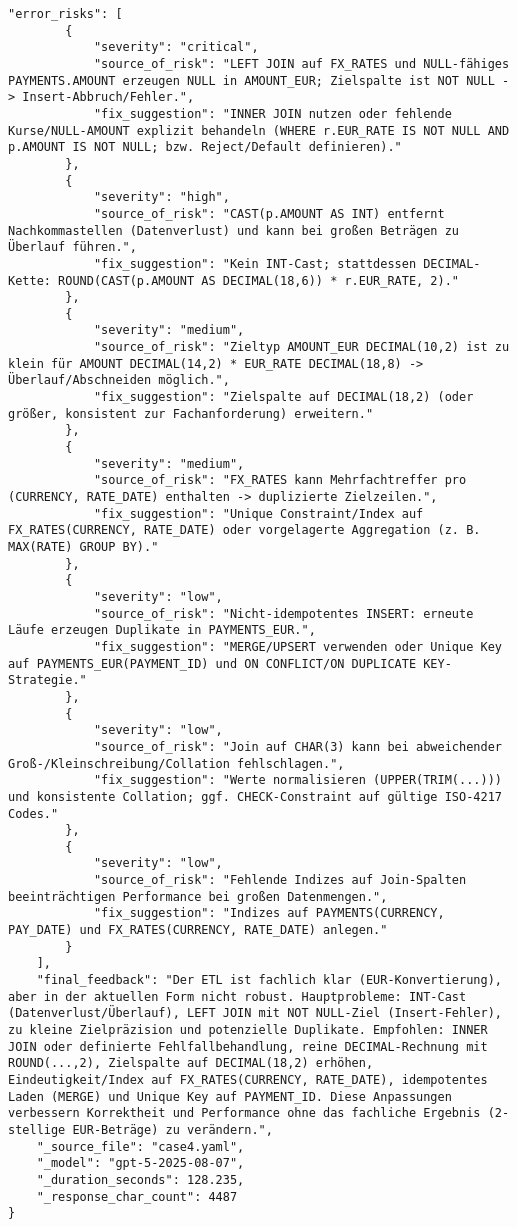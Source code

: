 \begin{lstlisting}[caption={Ausgabe: GPT-5 Anwendungsfall 4 Hauptdurchlauf},label={gpt_case4_prompt1}]
    "error_risks": [
        {
            "severity": "critical",
            "source_of_risk": "LEFT JOIN auf FX_RATES und NULL-fähiges PAYMENTS.AMOUNT erzeugen NULL in AMOUNT_EUR; Zielspalte ist NOT NULL -> Insert-Abbruch/Fehler.",
            "fix_suggestion": "INNER JOIN nutzen oder fehlende Kurse/NULL-AMOUNT explizit behandeln (WHERE r.EUR_RATE IS NOT NULL AND p.AMOUNT IS NOT NULL; bzw. Reject/Default definieren)."
        },
        {
            "severity": "high",
            "source_of_risk": "CAST(p.AMOUNT AS INT) entfernt Nachkommastellen (Datenverlust) und kann bei großen Beträgen zu Überlauf führen.",
            "fix_suggestion": "Kein INT-Cast; stattdessen DECIMAL-Kette: ROUND(CAST(p.AMOUNT AS DECIMAL(18,6)) * r.EUR_RATE, 2)."
        },
        {
            "severity": "medium",
            "source_of_risk": "Zieltyp AMOUNT_EUR DECIMAL(10,2) ist zu klein für AMOUNT DECIMAL(14,2) * EUR_RATE DECIMAL(18,8) -> Überlauf/Abschneiden möglich.",
            "fix_suggestion": "Zielspalte auf DECIMAL(18,2) (oder größer, konsistent zur Fachanforderung) erweitern."
        },
        {
            "severity": "medium",
            "source_of_risk": "FX_RATES kann Mehrfachtreffer pro (CURRENCY, RATE_DATE) enthalten -> duplizierte Zielzeilen.",
            "fix_suggestion": "Unique Constraint/Index auf FX_RATES(CURRENCY, RATE_DATE) oder vorgelagerte Aggregation (z. B. MAX(RATE) GROUP BY)."
        },
        {
            "severity": "low",
            "source_of_risk": "Nicht-idempotentes INSERT: erneute Läufe erzeugen Duplikate in PAYMENTS_EUR.",
            "fix_suggestion": "MERGE/UPSERT verwenden oder Unique Key auf PAYMENTS_EUR(PAYMENT_ID) und ON CONFLICT/ON DUPLICATE KEY-Strategie."
        },
        {
            "severity": "low",
            "source_of_risk": "Join auf CHAR(3) kann bei abweichender Groß-/Kleinschreibung/Collation fehlschlagen.",
            "fix_suggestion": "Werte normalisieren (UPPER(TRIM(...))) und konsistente Collation; ggf. CHECK-Constraint auf gültige ISO-4217 Codes."
        },
        {
            "severity": "low",
            "source_of_risk": "Fehlende Indizes auf Join-Spalten beeinträchtigen Performance bei großen Datenmengen.",
            "fix_suggestion": "Indizes auf PAYMENTS(CURRENCY, PAY_DATE) und FX_RATES(CURRENCY, RATE_DATE) anlegen."
        }
    ],
    "final_feedback": "Der ETL ist fachlich klar (EUR-Konvertierung), aber in der aktuellen Form nicht robust. Hauptprobleme: INT-Cast (Datenverlust/Überlauf), LEFT JOIN mit NOT NULL-Ziel (Insert-Fehler), zu kleine Zielpräzision und potenzielle Duplikate. Empfohlen: INNER JOIN oder definierte Fehlfallbehandlung, reine DECIMAL-Rechnung mit ROUND(...,2), Zielspalte auf DECIMAL(18,2) erhöhen, Eindeutigkeit/Index auf FX_RATES(CURRENCY, RATE_DATE), idempotentes Laden (MERGE) und Unique Key auf PAYMENT_ID. Diese Anpassungen verbessern Korrektheit und Performance ohne das fachliche Ergebnis (2-stellige EUR-Beträge) zu verändern.",
    "_source_file": "case4.yaml",
    "_model": "gpt-5-2025-08-07",
    "_duration_seconds": 128.235,
    "_response_char_count": 4487
}
\end{lstlisting}

